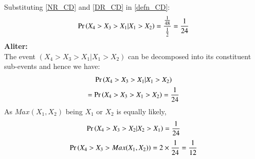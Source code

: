 \documentclass[journal,12pt,twocolumn]{IEEEtran}
\begin{document}
\begin{enumerate}
\begin{align}
\end{align}
Substituting \eqref{NR_CD} and \eqref{DR_CD} in \eqref{defn_CD}:
\begin{align}
    \Pr\left(X_4 > X_3 > X_1 | X_1 > X_2 \right) = \dfrac{\frac{1}{48}}{\frac{1}{2}} = \frac{1}{24}
\end{align}
\textbf{Aliter:}\\
The event $(X_4 > X_3 > X_1 | X_1 > X_2)$ can be decomposed into its constituent sub-events and hence we have:
\begin{multline}
    \Pr\left(X_4 > X_3 > X_1|X_1>X_2\right) \\= \Pr\left(X_4 > X_3 > X_1 > X_2\right) = \frac{1}{24}
\end{multline}
As $Max(X_1,X_2)$ being $X_1$ or $X_2$ is equally likely,
\begin{align}
\Pr\left(X_4 > X_3 > X_2| X_2 > X_1\right) = \frac{1}{24}
\end{align}
\begin{align}
    \Pr\left(X_4 > X_3 > Max(X_1,X_2)\right) = 2 \times \frac{1}{24} = \frac{1}{12}
\end{align}
\end{enumerate}

\bigskip
{}
\end{document}
